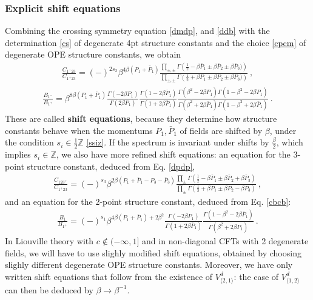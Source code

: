 \documentclass[12pt, a4paper]{article}
\theoremstyle{break}
\begin{document}
\subsubsection{Explicit shift equations}

Combining the crossing symmetry equation \eqref{dmdp}, and \eqref{ddb} with the determination \eqref{cs} of degenerate 4pt structure constants and the choice \eqref{cpcm} of degenerate OPE structure constants, we obtain
\begin{align}
 \boxed{\frac{C_{1^-23}}{C_{1^+23}} = 
 (-)^{2s_2}\beta^{4\beta (P_1+\bar P_1)} \frac{\prod_{\pm,\pm}\Gamma\left(\tfrac12 -\beta\bar P_1\pm\beta \bar P_2\pm\beta \bar P_3)\right)}{\prod_{\pm,\pm}
 \Gamma\left(\tfrac12 +\beta P_1\pm \beta P_2\pm\beta P_3)\right)}} \ ,
 \label{sh-mp}
\end{align}
\begin{align}
\boxed{\frac{B_{1^-}}{B_{1^+}} =
\beta^{8\beta (P_1+\bar P_1)} 
 \frac{\Gamma(-2\beta P_1)}{\Gamma(2\beta P_1)} \frac{\Gamma(1-2\beta \bar P_1)}{\Gamma(1+2\beta \bar P_1)}
 \frac{\Gamma\left(\beta^2-2\beta P_1\right)\Gamma\left(1-\beta^2-2\beta P_1\right)}{\Gamma\left(\beta^2+2\beta \bar P_1\right)\Gamma\left(1-\beta^2+2\beta \bar P_1\right)}}\ .
 \label{sh-b}
\end{align}
These are called \textbf{shift equations}, because they determine how structure constants behave when the momentums $P_1,\bar P_1$ of fields are shifted by $\beta$, under the condition $s_i\in \frac12 \mathbb{Z}$ \eqref{ssiz}. If the spectrum is invariant under shifts by $\frac{\beta}{2}$, which implies $s_i\in\mathbb{Z}$, we also have more refined shift equations: an equation for the 3-point structure constant, deduced from Eq. \eqref{dpdp},
\begin{align}
 \boxed{\frac{C_{123^+}}{C_{1^+23}} = 
 (-)^{s_3} \beta^{2\beta(P_1+\bar P_1-P_3-\bar P_3)}
 \frac{ \prod_\pm\Gamma\left(\frac12 -\beta\bar P_1 \pm \beta\bar P_2 +\beta\bar P_3\right)}{ \prod_\pm\Gamma\left(\frac12+\beta P_1 \pm \beta P_2 -\beta P_3\right)}}\ ,
 \label{sh-pp}
\end{align}
and an equation for the 2-point structure constant, deduced from Eq. \eqref{cbcb}:
\begin{align}
 \boxed{\frac{B_1}{B_{1^+}} =  (-)^{s_1}\beta^{4\beta (P_1+\bar P_1)+2\beta^2}\frac{\Gamma(-2\beta P_1)}{\Gamma(1+2\beta \bar P_1)}\frac{\Gamma(1-\beta^2-2\beta\bar P_1)}{\Gamma(\beta^2+2\beta P_1)} }\ .
 \label{sh-bb}
\end{align}
In Liouville theory with $c\notin (-\infty,1]$ and in non-diagonal CFTs with 2 degenerate fields, we will have to use slighly modified shift equations, obtained by choosing slighly different degenerate OPE structure constants. Moreover, we have only written shift equations that follow from the existence of $V^d_{\langle 2,1\rangle}$: the case of $V^d_{\langle 1,2\rangle}$ can then be deduced by $\beta \to \beta^{-1}$.
\end{document}
